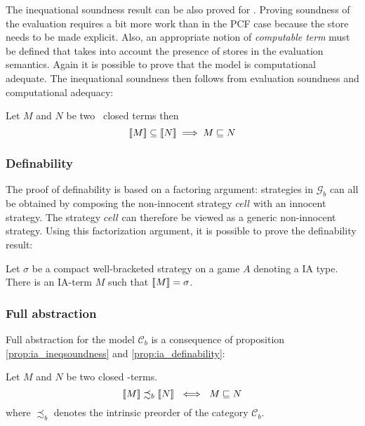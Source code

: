 The inequational soundness result can be also proved for \ialgol.
Proving soundness of the evaluation requires a bit more work than in the PCF case because
the store needs to be made explicit. Also, an appropriate notion of \emph{computable term} must be defined
that takes into account the presence of stores in the evaluation semantics.
Again it is possible to prove that the model is computational adequate.
The inequational soundness then follows from evaluation soundness and computational adequacy:


\begin{prop}
\label{prop:ia_ineqsoundness} Let $M$ and $N$ be two \ialgol\ closed terms then
$${[\![ M ]\!]} \subseteq {[\![N ]\!]} \implies  M \sqsubseteq N $$
\end{prop}

\subsubsection{Definability}

The proof of definability is based on a factoring argument: strategies in
$\mathcal{G}_b$ can all be obtained by composing the non-innocent strategy $cell$ with an innocent strategy.
The strategy $cell$ can therefore be viewed as a generic non-innocent strategy. Using this factorization argument,
it is possible to prove the definability result:
\begin{prop}[Definability]
\label{prop:ia_definability} Let $\sigma$ be a compact well-bracketed
strategy on a game $A$ denoting a IA type. There is an IA-term $M$ such
that ${[\![ M ]\!]} = \sigma$.
\end{prop}

\subsubsection{Full abstraction}

Full abstraction for the model $\mathcal{C}_b$ is a consequence of proposition
\ref{prop:ia_ineqsoundness} and \ref{prop:ia_definability}:
\begin{thm}
Let $M$ and $N$ be two closed \ialgol-terms.
$${[\![ M ]\!]} \precsim_b {[\![ N ]\!]} \ \iff \ M \sqsubseteq N$$
where $\precsim_b$ denotes the intrinsic preorder of the category
$\mathcal{C}_b$.
\end{thm}



